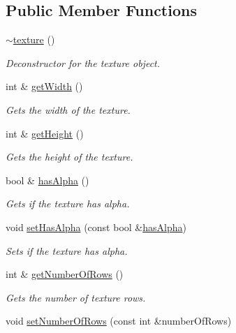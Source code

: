 \subsection*{Public Member Functions}
\begin{DoxyCompactItemize}
\item 
\hyperlink{classflounder_1_1texture_a8271c7f9860a5a235be9b1207bed2c39}{$\sim$texture} ()
\begin{DoxyCompactList}\small\item\em Deconstructor for the texture object. \end{DoxyCompactList}\item 
int \& \hyperlink{classflounder_1_1texture_ad005b686f17fec6934fb57fab7f850a4}{get\+Width} ()
\begin{DoxyCompactList}\small\item\em Gets the width of the texture. \end{DoxyCompactList}\item 
int \& \hyperlink{classflounder_1_1texture_a9e96af5833ca7e542366e0440d820d67}{get\+Height} ()
\begin{DoxyCompactList}\small\item\em Gets the height of the texture. \end{DoxyCompactList}\item 
bool \& \hyperlink{classflounder_1_1texture_a86178b4271979267f92200a0b7b2e405}{has\+Alpha} ()
\begin{DoxyCompactList}\small\item\em Gets if the texture has alpha. \end{DoxyCompactList}\item 
void \hyperlink{classflounder_1_1texture_ac05209e3a9686903a336575ac71b8f0e}{set\+Has\+Alpha} (const bool \&\hyperlink{classflounder_1_1texture_a86178b4271979267f92200a0b7b2e405}{has\+Alpha})
\begin{DoxyCompactList}\small\item\em Sets if the texture has alpha. \end{DoxyCompactList}\item 
int \& \hyperlink{classflounder_1_1texture_adaf850aeb5d498673962a9067d40463a}{get\+Number\+Of\+Rows} ()
\begin{DoxyCompactList}\small\item\em Gets the number of texture rows. \end{DoxyCompactList}\item 
void \hyperlink{classflounder_1_1texture_ac0854bbd1a260380db88f378b408aa18}{set\+Number\+Of\+Rows} (const int \&number\+Of\+Rows)

\end{DoxyCompactItemize}
